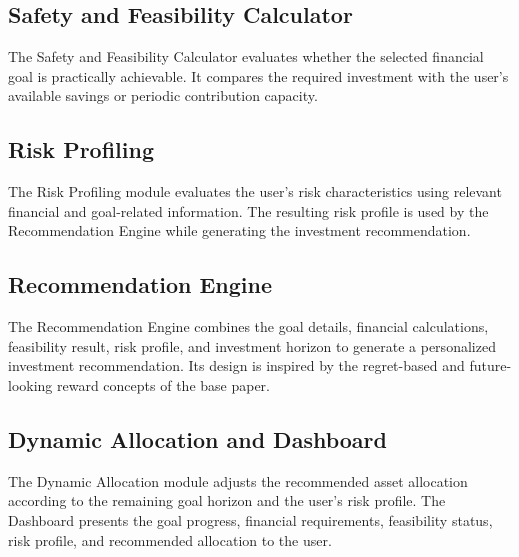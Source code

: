 \subsection{Safety and Feasibility Calculator}
The Safety and Feasibility Calculator evaluates whether the selected financial goal is practically achievable. It compares the required investment with the user's available savings or periodic contribution capacity.

\subsection{Risk Profiling}
The Risk Profiling module evaluates the user's risk characteristics using relevant financial and goal-related information. The resulting risk profile is used by the Recommendation Engine while generating the investment recommendation.

\subsection{Recommendation Engine}
The Recommendation Engine combines the goal details, financial calculations, feasibility result, risk profile, and investment horizon to generate a personalized investment recommendation. Its design is inspired by the regret-based and future-looking reward concepts of the base paper.

\subsection{Dynamic Allocation and Dashboard}
The Dynamic Allocation module adjusts the recommended asset allocation according to the remaining goal horizon and the user's risk profile. The Dashboard presents the goal progress, financial requirements, feasibility status, risk profile, and recommended allocation to the user.

